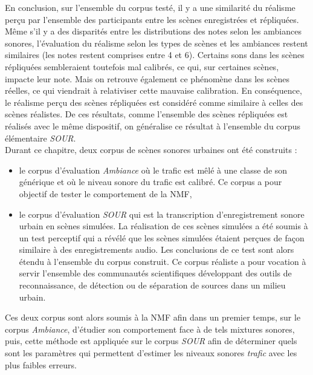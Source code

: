 En conclusion, sur l'ensemble du corpus testé, il y a une similarité du réalisme perçu par l'ensemble des participants entre les scènes enregistrées et répliquées. Même s'il y a des disparités entre les distributions des notes selon les ambiances sonores, l'évaluation du réalisme selon les types de scènes et les ambiances restent similaires (les notes restent comprises entre 4 et 6). 
Certains sons dans les scènes répliquées sembleraient toutefois mal calibrés, ce qui, sur certaines scènes, impacte leur note. Mais on retrouve également ce phénomène dans les scènes réelles, ce qui viendrait à relativiser cette mauvaise calibration.
En conséquence, le réalisme perçu des scènes répliquées est considéré comme similaire à celles des scènes réalistes. 
De ces résultats, comme l'ensemble des scènes répliquées est réalisés avec le même dispositif, on généralise ce résultat à l'ensemble du corpus élémentaire \textit{SOUR}.\\

Durant ce chapitre, deux corpus de scènes sonores urbaines ont été construits :
\begin{itemize}
\item le corpus d'évaluation \textit{Ambiance} où le trafic est mêlé à une classe de son générique et où le niveau sonore du trafic est calibré.  Ce corpus a pour objectif de tester le comportement de la NMF,
\item le corpus d'évaluation \textit{SOUR} qui est la transcription d'enregistrement sonore urbain en scènes simulées. La réalisation de ces scènes simulées a été soumis à un test perceptif qui a révélé que les scènes simulées étaient perçues de façon similaire à des enregistrements audio. Les conclusions de ce test sont alors étendu à l'ensemble du corpus construit. Ce corpus réaliste a pour vocation à servir l'ensemble des communautés scientifiques développant des outils de reconnaissance, de détection ou de séparation de sources dans un milieu urbain. \\
\end{itemize}

Ces deux corpus sont alors soumis à la NMF afin dans un premier temps, sur le corpus \textit{Ambiance}, d'étudier son comportement face à de tels mixtures sonores, puis, cette méthode est appliquée sur le corpus \textit{SOUR} afin de déterminer quels sont les paramètres qui permettent d'estimer les niveaux sonores \textit{trafic} avec les plus faibles erreurs.


